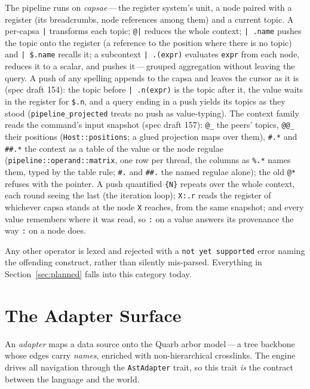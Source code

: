 \documentclass{report}
\begin{document}
The pipeline runs on \emph{capsae}\,---\,the register system's unit,
a node paired with a register (its breadcrumbs, node references
among them) and a current topic. A per-capsa \texttt{|} transforms
each topic; \texttt{@|} reduces the whole context; \texttt{| .name}
pushes the topic onto the register (a reference to the position
where there is no topic) and \texttt{| \$.name} recalls it; a
subcontext \texttt{| .(expr)}
evaluates \texttt{expr} from each node, reduces it to a scalar, and
pushes it\,---\,grouped aggregation without leaving the query. A
push of any spelling appends to the capsa and leaves the cursor as
it is (spec draft 154): the topic before \texttt{| .n(expr)} is the
topic after it, the value waits in the register for
\texttt{\$.n}, and a query ending in a push yields its topics as
they stood (\texttt{pipeline\_projected} treats no push as
value-typing). The context family reads the command's input
snapshot (spec draft 157): \texttt{@\_} the peers' topics,
\texttt{@@\_} their positions (\texttt{Host::positions}; a glued
projection maps over them), \texttt{\#.*} and \texttt{\#\#.*} the
context as a table of the value or the node regulae
(\texttt{pipeline::operand::matrix}, one row per thread, the columns
as \texttt{\%.*} names them, typed by the table rule; \texttt{\#.} and \texttt{\#\#.} the named regulae alone); the old
\texttt{@*} refuses with the pointer. A
push quantified \texttt{\{N\}} repeats over the whole context, each
round seeing the last (the iteration loop); \texttt{X:.r} reads the
register of whichever capsa stands at the node \texttt{X} reaches,
from the same snapshot; and every value remembers where it was
read, so \texttt{:} on a value answers its provenance the way
\texttt{:} on a node does.

\medskip

Any other operator is lexed and rejected with a
\texttt{not yet supported} error naming the offending construct,
rather than silently mis-parsed. Everything in
Section~\ref{sec:planned} falls into this category today.


\chapter{The Adapter Surface}\label{ch:adapter}

An \emph{adapter} maps a data source onto the Quarb arbor model\,---\,a
tree backbone whose edges carry \emph{names}, enriched with
non-hierarchical crosslinks. The engine drives all navigation through
the \texttt{AstAdapter} trait, so this trait \emph{is} the contract
between the language and the world.
\end{document}
